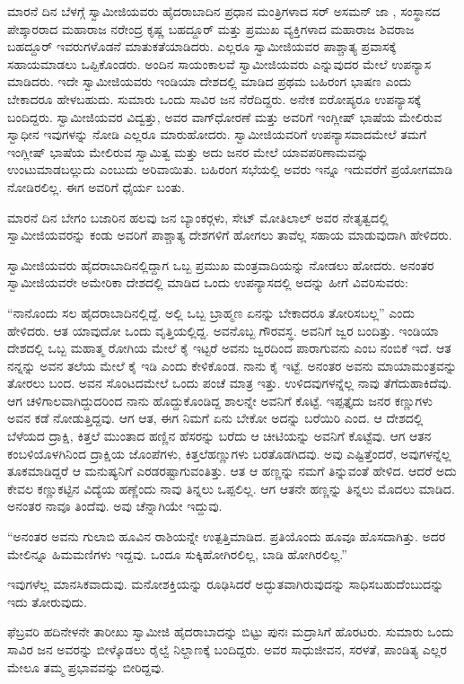\vskip 3pt

 ಮಾರನೆ ದಿನ ಬೆಳಗ್ಗೆ ಸ್ವಾಮೀಜಿಯವರು ಹೈದರಾಬಾದಿನ ಪ್ರಧಾನ ಮಂತ್ರಿಗಳಾದ ಸರ್ ಅಸಮನ್ ಜಾ , ಸಂಸ್ಥಾನದ ಪೇಶ್ಕಾರರಾದ ಮಹಾರಾಜ ನರೇಂದ್ರ ಕೃಷ್ಣ ಬಹದ್ದೂರ್ ಮತ್ತು ಪ್ರಮುಖ ವ್ಯಕ್ತಿಗಳಾದ ಮಹಾರಾಜ ಶಿವರಾಜ ಬಹದ್ದೂರ್ ಇವರುಗಳೊಡನೆ ಮಾತುಕತೆಯಾಡಿದರು. ಎಲ್ಲರೂ ಸ್ವಾಮೀಜಿಯವರ ಪಾಶ್ಚಾತ್ಯ ಪ್ರವಾಸಕ್ಕೆ ಸಹಾಯಮಾಡಲು ಒಪ್ಪಿಕೊಂಡರು. ಅಂದಿನ ಸಾಯಂಕಾಲವೆ ಸ್ವಾಮೀಜಿಯವರು  ಎನ್ನುವುದರ ಮೇಲೆ ಉಪನ್ಯಾಸ ಮಾಡಿದರು. ಇದೇ ಸ್ವಾಮೀಜಿಯವರು ಇಂಡಿಯಾ ದೇಶದಲ್ಲಿ ಮಾಡಿದ ಪ್ರಥಮ ಬಹಿರಂಗ ಭಾಷಣ ಎಂದು ಬೇಕಾದರೂ ಹೇಳಬಹುದು. ಸುಮಾರು ಒಂದು ಸಾವಿರ ಜನ ನೆರೆದಿದ್ದರು. ಅನೇಕ ಐರೋಪ್ಯರೂ ಉಪನ್ಯಾಸಕ್ಕೆ ಬಂದಿದ್ದರು. ಸ್ವಾಮೀಜಿಯವರ ವಿದ್ವತ್ತು, ಅವರ ವಾಗ್‍ಧೋರಣೆ ಮತ್ತು ಅವರಿಗೆ ಇಂಗ್ಲೀಷ್ ಭಾಷೆಯ ಮೇಲಿರುವ ಸ್ವಾಧೀನ ಇವುಗಳನ್ನು ನೋಡಿ ಎಲ್ಲರೂ ಮಾರುಹೋದರು. ಸ್ವಾಮೀಜಿಯವರಿಗೆ ಉಪನ್ಯಾಸವಾದಮೇಲೆ ತಮಗೆ ಇಂಗ್ಲೀಷ್ ಭಾಷೆಯ ಮೇಲಿರುವ ಸ್ವಾಮಿತ್ವ ಮತ್ತು ಅದು ಜನರ ಮೇಲೆ ಯಾವ\break ಪರಿಣಾಮವನ್ನು ಉಂಟುಮಾಡಬಲ್ಲುದು ಎಂಬುದು ಅರಿವಾಯಿತು. ಬಹಿರಂಗ ಸಭೆಯಲ್ಲಿ ಅವರು ಇನ್ನೂ ಇದುವರೆಗೆ ಪ್ರಯೋಗಮಾಡಿ ನೋಡಿರಲಿಲ್ಲ. ಈಗ ಅವರಿಗೆ ಧೈರ್ಯ ಬಂತು.

\vskip 3pt

 ಮಾರನೆ ದಿನ ಬೇಗಂ ಬಜಾರಿನ ಹಲವು ಜನ ಬ್ಯಾಂಕರ್‍ಗಳು, ಸೇಟ್ ಮೋತಿ‍ಲಾಲ್ ಅವರ ನೇತೃತ್ವದಲ್ಲಿ ಸ್ವಾಮೀಜಿಯವರನ್ನು ಕಂಡು ಅವರಿಗೆ ಪಾಶ್ಚಾತ್ಯ ದೇಶಗಳಿಗೆ ಹೋಗಲು ತಾವೆಲ್ಲ ಸಹಾಯ ಮಾಡುವುದಾಗಿ ಹೇಳಿದರು. 

 ಸ್ವಾಮೀಜಿಯವರು ಹೈದರಾಬಾದಿನಲ್ಲಿದ್ದಾಗ ಒಬ್ಬ ಪ್ರಮುಖ ಮಂತ್ರವಾದಿಯನ್ನು ನೋಡಲು ಹೋದರು. ಅನಂತರ ಸ್ವಾಮೀಜಿಯವರೇ ಅಮೇರಿಕಾ ದೇಶದಲ್ಲಿ ಮಾಡಿದ ಒಂದು ಉಪನ್ಯಾಸದಲ್ಲಿ ಅದನ್ನು ಹೀಗೆ ವಿವರಿಸುವರು: 

 “ನಾನೊಂದು ಸಲ ಹೈದರಾಬಾದಿನಲ್ಲಿದ್ದೆ. ಅಲ್ಲಿ ಒಬ್ಬ ಬ್ರಾಹ್ಮಣ ಏನನ್ನು ಬೇಕಾದರೂ ತೋರಿಸಬಲ್ಲ” ಎಂದು ಹೇಳಿದರು. ಆತ ಯಾವುದೋ ಒಂದು ವೃತ್ತಿಯಲ್ಲಿದ್ದ. ಅವನೊಬ್ಬ ಗೌರವಸ್ಥ. ಅವನಿಗೆ ಜ್ವರ ಬಂದಿತ್ತು. ಇಂಡಿಯಾ ದೇಶದಲ್ಲಿ ಒಬ್ಬ ಮಹಾತ್ಮ ರೋಗಿಯ ಮೇಲೆ ಕೈ ಇಟ್ಟರೆ ಅವನು ಜ್ವರದಿಂದ ಪಾರಾಗುವನು ಎಂಬ ನಂಬಿಕೆ ಇದೆ. ಆತ ನನ್ನನ್ನು ಅವನ ತಲೆಯ ಮೇಲೆ ಕೈ ಇಡಿ ಎಂದು ಕೇಳಿಕೊಂಡ. ನಾನು ಕೈ ಇಟ್ಟೆ. ಅನಂತರ ಅವನು ಮಾಯಾಮಂತ್ರವನ್ನು ತೋರಲು ಬಂದ. ಅವನ ಸೊಂಟದಮೇಲೆ ಒಂದು ಪಂಚೆ ಮಾತ್ರ ಇತ್ತು. ಉಳಿದವುಗಳನ್ನೆಲ್ಲ ನಾವು ತೆಗೆದುಹಾಕಿದೆವು. ಆಗ ಚಳಿಗಾಲವಾಗಿದ್ದುದರಿಂದ ನಾನು ಹೊದ್ದುಕೊಂಡಿದ್ದ ಶಾಲನ್ನೇ ಅವನಿಗೆ ಕೊಟ್ಟೆ. ಇಪ್ಪತ್ತೈದು ಜನರ ಕಣ್ಣುಗಳು ಅವನ ಕಡೆ ನೋಡುತ್ತಿದ್ದವು. ಆಗ ಆತ, ಈಗ ನಿಮಗೆ ಏನು ಬೇಕೋ ಅದನ್ನು ಬರೆಯಿರಿ ಎಂದ. ಆ ದೇಶದಲ್ಲಿ ಬೆಳೆಯದ ದ್ರಾಕ್ಷಿ, ಕಿತ್ತಲೆ ಮುಂತಾದ ಹಣ್ಣಿನ ಹೆಸರನ್ನು ಬರೆದು ಆ ಚೀಟಿಯನ್ನು ಅವನಿಗೆ ಕೊಟ್ಟೆವು. ಆಗ ಆತನ ಕಂಬಳಿಯೊಳಗಿನಿಂದ ದ್ರಾಕ್ಷಿಯ ಜೊಂಪೆಗಳು, ಕಿತ್ತಲೆಹಣ್ಣುಗಳು ಬರತೊಡಗಿದವು. ಅವು ಎಷ್ಟಿತ್ತೆಂದರೆ, ಅವುಗಳನ್ನೆಲ್ಲ ತೂಕಮಾಡಿದ್ದರೆ ಆ ಮನುಷ್ಯನಿಗೆ ಎರಡರಷ್ಟಾಗುವಂತಿತ್ತು. ಆತ ಆ ಹಣ್ಣನ್ನು ನಮಗೆ ತಿನ್ನುವಂತೆ ಹೇಳಿದ. ಆದರೆ ಅದು ಕೇವಲ ಕಣ್ಣುಕಟ್ಟಿನ ವಿದ್ಯೆಯ ಹಣ್ಣೆಂದು ನಾವು ತಿನ್ನಲು ಒಪ್ಪಲಿಲ್ಲ. ಆಗ ಆತನೇ ಹಣ್ಣನ್ನು ತಿನ್ನಲು ಮೊದಲು ಮಾಡಿದ. ಅನಂತರ ನಾವೂ ತಿಂದೆವು. ಅವು ಚೆನ್ನಾಗಿಯೇ ಇದ್ದುವು. 

 “ಅನಂತರ ಅವನು ಗುಲಾಬಿ ಹೂವಿನ ರಾಶಿಯನ್ನೇ ಉತ್ಪತ್ತಿಮಾಡಿದ. ಪ್ರತಿಯೊಂದು ಹೂವೂ ಹೊಸದಾಗಿತ್ತು. ಅದರ ಮೇಲಿನ್ನೂ ಹಿಮಮಣಿಗಳು ಇದ್ದವು. ಒಂದೂ ಸುಕ್ಕಿಹೋಗಿರಲಿಲ್ಲ, ಬಾಡಿ ಹೋಗಿರಲಿಲ್ಲ.” 

 ಇವುಗಳೆಲ್ಲ ಮಾನಸಿಕವಾದುವು. ಮನೋಶಕ್ತಿಯನ್ನು ರೂಢಿಸಿದರೆ ಅದ್ಭುತವಾಗಿರುವುದನ್ನು ಸಾಧಿಸಬಹುದೆಂಬುದನ್ನು ಇದು ತೋರುವುದು.

\newpage

 ಫೆಬ್ರವರಿ ಹದಿನೇಳನೇ ತಾರೀಖು ಸ್ವಾಮೀಜಿ ಹೈದರಾಬಾದನ್ನು ಬಿಟ್ಟು ಪುನಃ ಮದ್ರಾಸಿಗೆ ಹೊರಟರು. ಸುಮಾರು ಒಂದು ಸಾವಿರ ಜನ ಅವರನ್ನು ಬೀಳ್ಕೊಡಲು ರೈಲ್ವೆ ನಿಲ್ದಾಣಕ್ಕೆ ಬಂದಿದ್ದರು. ಅವರ ಸಾಧುಜೀವನ, ಸರಳತೆ, ಪಾಂಡಿತ್ಯ ಎಲ್ಲರ ಮೇಲೂ ತಮ್ಮ ಪ್ರಭಾವವನ್ನು ಬೀರಿದ್ದವು. 

